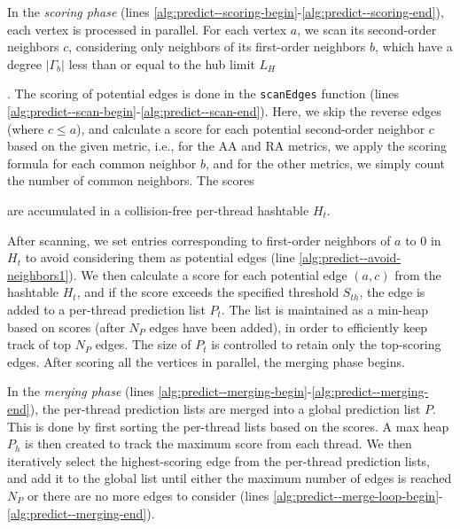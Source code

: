 In the \textit{scoring phase} (lines \ref{alg:predict--scoring-begin}-\ref{alg:predict--scoring-end}), each vertex is processed in parallel. For each vertex $a$, we scan its second-order neighbors $c$, considering only neighbors of its first-order neighbors $b$, which have a degree $|\Gamma_b|$ less than or equal to the hub limit $L_H$. The scoring of potential edges is done in the \texttt{scanEdges} function (lines \ref{alg:predict--scan-begin}-\ref{alg:predict--scan-end}). Here, we skip the reverse edges (where $c \leq a$), and calculate a score for each potential second-order neighbor $c$ based on the given metric, i.e., for the AA and RA metrics, we apply the scoring formula for each common neighbor $b$, and for the other metrics, we simply count the number of common neighbors. The scores are accumulated in a collision-free per-thread hashtable $H_t$.

After scanning, we set entries corresponding to first-order neighbors of $a$ to $0$ in $H_t$ to avoid considering them as potential edges (line \ref{alg:predict--avoid-neighbors1}). We then calculate a score for each potential edge $(a, c)$ from the hashtable $H_t$, and if the score exceeds the specified threshold $S_{th}$, the edge is added to a per-thread prediction list $P_t$. The list is maintained as a min-heap based on scores (after $N_P$ edges have been added), in order to efficiently keep track of top $N_P$ edges. The size of $P_t$ is controlled to retain only the top-scoring edges. After scoring all the vertices in parallel, the merging phase begins.

In the \textit{merging phase} (lines \ref{alg:predict--merging-begin}-\ref{alg:predict--merging-end}), the per-thread prediction lists are merged into a global prediction list $P$. This is done by first sorting the per-thread lists based on the scores. A max heap $P_h$ is then created to track the maximum score from each thread. We then iteratively select the highest-scoring edge from the per-thread prediction lists, and add it to the global list until either the maximum number of edges is reached $N_P$ or there are no more edges to consider (lines \ref{alg:predict--merge-loop-begin}-\ref{alg:predict--merging-end}).



